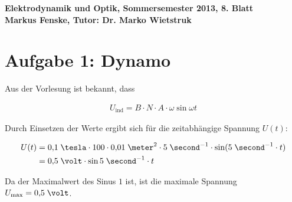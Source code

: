 \documentclass[a4paper,german,12pt,smallheadings]{scrartcl}
\begin{document}
\begin{center}
\bfseries %
\sffamily %
\vspace{-40pt}
Elektrodynamik und Optik, Sommersemester 2013, 8. Blatt \\
Markus Fenske, Tutor: Dr. Marko Wietstruk
\vspace{-10pt}
\end{center}
\section*{Aufgabe 1: Dynamo}

Aus der Vorlesung ist bekannt, dass

\begin{align*}
  U_{\text{ind}} = B \cdot N \cdot A \cdot \omega \sin \omega t
\end{align*}

Durch Einsetzen der Werte ergibt sich für die zeitabhängige Spannung $U(t)$:

\begin{align*}
  U(t) &= 0{,}1 \;\tesla \cdot 100 \cdot 0{,}01 \;\meter^2 \cdot 5 \;\second^{-1} \cdot \sin(5 \;\second^{-1} \cdot t) \\
       &= 0{,}5 \;\volt \cdot \sin 5 \;\second^{-1} \cdot t
\end{align*}

Da der Maximalwert des Sinus $1$ ist, ist die maximale Spannung $U_{\text{max}} = 0{,}5 \;\volt$.
\end{document}
